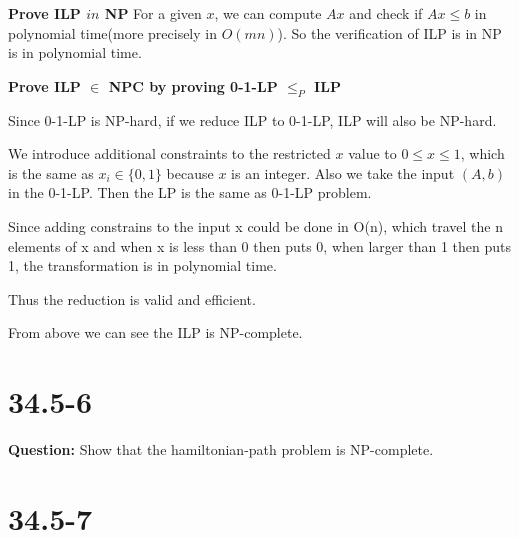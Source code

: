 \documentclass[12pt]{article}
\begin{document}


\textbf{Prove ILP $in$ NP}
For a given $x$, we can compute $Ax$ and check if $Ax \leq b$ in polynomial time(more precisely in $O(mn)$). So the verification of ILP is in NP is in polynomial time.

\textbf{Prove ILP $\in$ NPC by proving 0-1-LP $\leq_{P}$ ILP}

Since 0-1-LP is NP-hard, if we reduce ILP to 0-1-LP, ILP will also be NP-hard. 

We introduce additional constraints to the restricted $x$ value to $0 \leq x \leq 1$, which is the same as $x_i \in \{0,1\}$ because $x$ is an integer. Also we take the input $(A,b)$ in the 0-1-LP. Then the LP is the same as 0-1-LP problem.

Since adding constrains to the input x could be done in O(n), which travel the n elements of x and when x is less than 0 then puts 0, when larger than 1 then puts 1, the transformation is in polynomial time.

Thus the reduction is valid and efficient.

From above we can see the ILP is NP-complete.

\section{34.5-6}
\textbf{Question: }Show that the hamiltonian-path problem is NP-complete.

\section{34.5-7}
\end{document}
